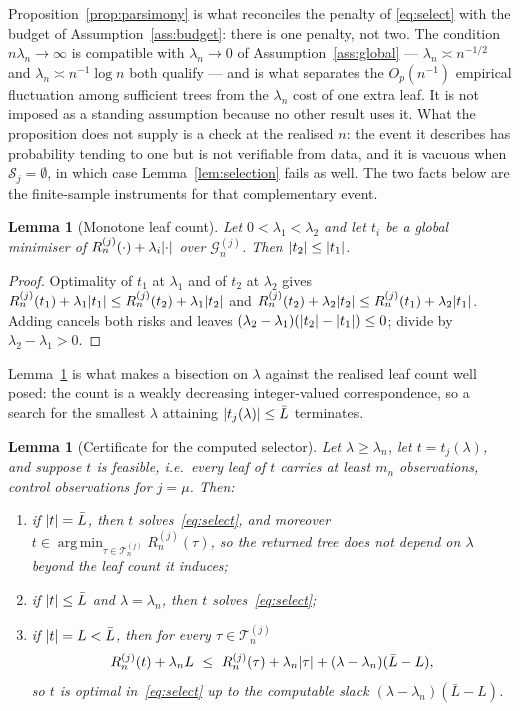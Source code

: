 \documentclass[11pt]{article}
\theoremstyle{plain}
\newtheorem{lemma}[theorem]{Lemma}
\theoremstyle{definition}
\theoremstyle{remark}
\newcommand{\cT}{\mathcal{T}}
\newcommand{\cS}{\mathcal{S}}
\newcommand{\cG}{\mathcal{G}}
\DeclareMathOperator*{\argmin}{arg\,min}
\DeclarePairedDelimiter{\card}{\lvert}{\rvert}
\begin{document}
\noindent Proposition~\ref{prop:parsimony} is what reconciles the penalty of
\eqref{eq:select} with the budget of Assumption~\ref{ass:budget}: there is one
penalty, not two. The condition $n\lambda_n\to\infty$ is compatible with
$\lambda_n\to0$ of Assumption~\ref{ass:global} --- $\lambda_n\asymp n^{-1/2}$
and $\lambda_n\asymp n^{-1}\log n$ both qualify --- and is what separates the
$O_p(n^{-1})$ empirical fluctuation among sufficient trees from the $\lambda_n$
cost of one extra leaf. It is not imposed as a standing assumption because no
other result uses it. What the proposition does not supply is a check at the
realised $n$: the event it describes has probability tending to one but is not
verifiable from data, and it is vacuous when $\cS_j=\emptyset$, in which case
Lemma~\ref{lem:selection} fails as well. The two facts below are the
finite-sample instruments for that complementary event.

\begin{lemma}[Monotone leaf count]\label{lem:lambda-mono}
Let $0<\lambda_1<\lambda_2$ and let $t_i$ be a global minimiser of
$R^{(j)}_n(\cdot)+\lambda_i\card{\cdot}$ over $\cG^{(j)}_n$. Then
$\card{t_2}\le\card{t_1}$.
\end{lemma}

\begin{proof}
Optimality of $t_1$ at $\lambda_1$ and of $t_2$ at $\lambda_2$ gives
$R^{(j)}_n(t_1)+\lambda_1\card{t_1}\le R^{(j)}_n(t_2)+\lambda_1\card{t_2}$ and
$R^{(j)}_n(t_2)+\lambda_2\card{t_2}\le R^{(j)}_n(t_1)+\lambda_2\card{t_1}$.
Adding cancels both risks and leaves
$(\lambda_2-\lambda_1)(\card{t_2}-\card{t_1})\le0$; divide by
$\lambda_2-\lambda_1>0$.
\end{proof}

\noindent Lemma~\ref{lem:lambda-mono} is what makes a bisection on $\lambda$
against the realised leaf count well posed: the count is a weakly decreasing
integer-valued correspondence, so a search for the smallest $\lambda$ attaining
$\card{t_j(\lambda)}\le\bar L$ terminates.

\begin{lemma}[Certificate for the computed selector]\label{lem:lambda-exact}
Let $\lambda\ge\lambda_n$, let $t=t_j(\lambda)$, and suppose $t$ is feasible,
i.e.\ every leaf of $t$ carries at least $m_n$ observations, control
observations for $j=\mu$. Then:
\begin{enumerate}
\item[(i)] if $\card t=\bar L$, then $t$ solves~\eqref{eq:select}, and moreover
  $t\in\argmin_{\tau\in\cT^{(j)}_n}R^{(j)}_n(\tau)$, so the returned tree does
  not depend on $\lambda$ beyond the leaf count it induces;
\item[(ii)] if $\card t\le\bar L$ and $\lambda=\lambda_n$, then $t$
  solves~\eqref{eq:select};
\item[(iii)] if $\card t=L<\bar L$, then for every $\tau\in\cT^{(j)}_n$
  \[
    R^{(j)}_n(t)+\lambda_nL
    \ \le\ R^{(j)}_n(\tau)+\lambda_n\card\tau
      +(\lambda-\lambda_n)(\bar L-L),
  \]
  so $t$ is optimal in~\eqref{eq:select} up to the computable slack
  $(\lambda-\lambda_n)(\bar L-L)$.
\end{enumerate}
\end{lemma}
\end{document}
